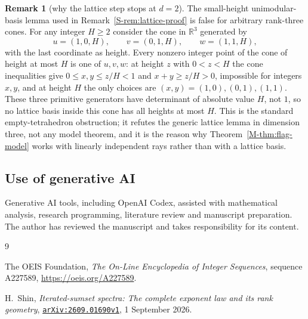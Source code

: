 \documentclass[11pt,reqno]{amsart}
\theoremstyle{plain}
\theoremstyle{definition}
\theoremstyle{plain}
\newcommand{\R}{\mathbb{R}}
\theoremstyle{plain}
\theoremstyle{plain}
\theoremstyle{plain}
\theoremstyle{plain}
\theoremstyle{plain}
\theoremstyle{definition}
\theoremstyle{definition}
\newtheorem{Sremark}[Stheorem]{Remark}
\theoremstyle{definition}
\theoremstyle{plain}
\begin{document}
\begin{Sremark}[why the lattice step stops at $d=2$]\label{S-rem:empty-tetrahedron}
The small-height unimodular-basis lemma used in
Remark~\ref{S-rem:lattice-proof} is false for arbitrary rank-three cones. For
any integer $H\ge2$ consider the cone in $\R^3$ generated by
\[
 u=(1,0,H),\qquad v=(0,1,H),\qquad w=(1,1,H),
\]
with the last coordinate as height. Every nonzero integer point of the cone
of height at most $H$ is one of $u,v,w$: at height $z$ with $0<z<H$ the cone
inequalities give $0\le x,y\le z/H<1$ and $x+y\ge z/H>0$, impossible for
integers $x,y$, and at height $H$ the only choices are $(x,y)=(1,0),(0,1),(1,1)$.
These three primitive generators have determinant of absolute value $H$, not
$1$, so no lattice basis inside this cone has all heights at most $H$. This
is the standard empty-tetrahedron obstruction; it refutes the generic lattice
lemma in dimension three, not any model theorem, and it is the reason why
Theorem~\ref{M-thm:flag-model} works with linearly independent rays rather than
with a lattice basis.
\end{Sremark}



\subsection*{Use of generative AI}
Generative AI tools, including OpenAI Codex, assisted with mathematical
analysis, research programming, literature review and manuscript preparation.
The author has reviewed the manuscript and takes responsibility for its content.


\begin{thebibliography}{9}

 The OEIS Foundation,
\emph{The On-Line Encyclopedia of Integer Sequences},
sequence A227589, \url{https://oeis.org/A227589}.

 H.~Shin,
\emph{Iterated-sumset spectra: The complete exponent law and its rank geometry},
\href{https://arxiv.org/abs/2609.01690v1}{\texttt{arXiv:2609.01690v1}},
1 September 2026.

\end{thebibliography}
\end{document}
